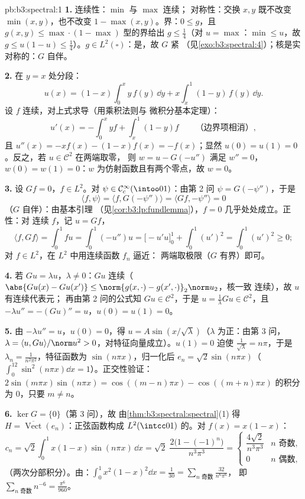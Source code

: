 \begin{solution}{pb:b3:spectral:1}
\textbf{1.} 连续性：$\min$ 与 $\max$ 连续；
对称性：交换 $x, y$ 既不改变 $\min(x,y)$，也不改变 $1 -
\max(x,y)$。界：$0 \leq g$，且 $g(x,y) \leq
\max\cdot(1-\max)$ 型的界给出 $g \leq \frac14$（对 $u
= \max$：$\min \leq u$，故 $g \leq u(1-u) \leq \frac14$）。$g
\in L^2(\square)$：是，故 $G$ 紧
（见\cref{exo:b3:spectral:4}）；核是实对称的：$G$
自伴。

\textbf{2.} 在 $y = x$ 处分段：
\[
u(x) = (1 - x)\int_0^x y\,f(y)\,\dd y +
x\int_x^1(1 - y)\,f(y)\,\dd y .
\]
设 $f$ 连续，对上式求导（用乘积法则与
微积分基本定理）：
\[
u'(x) = -\int_0^xyf + \int_x^1(1-y)f
\qquad\text{（边界项相消）},
\]
且 $u''(x) = -xf(x) - (1 - x)f(x) = -f(x)$；显然 $u(0) =
u(1) = 0$。反之，若 $u \in \mathcal C^2$ 在两端取零，
则 $w = u - G(-u'')$ 满足 $w'' = 0$，$w(0) = w(1) =
0$：$w$ 为仿射函数且有两个零点，故 $w = 0$。

\textbf{3.} 设 $Gf = 0$，$f \in L^2$。对 $\psi \in \mathcal
C_c^\infty(\intoo01)$：由第 2 问 $\psi = G(-\psi'')$，于是
\[
\langle f, \psi\rangle = \langle f, G(-\psi'')\rangle
= \langle Gf, -\psi''\rangle = 0
\]
（$G$ 自伴）：由基本引理
（见\cref{cor:b3:lp:fundlemma}），$f = 0$ 几乎处处成立。正性：对
连续 $f$，记 $u = Gf$，
\[
\langle f, Gf\rangle = \int_0^1 fu = \int_0^1(-u'')u
= \bigl[-u'u\bigr]_0^1 + \int_0^1(u')^2 = \int_0^1(u')^2
\geq 0 ;
\]
对 $f \in L^2$，在 $L^2$ 中用连续函数 $f_n$ 逼近：
两端取极限（$G$ 有界）即可。

\textbf{4.} 若 $Gu = \lambda u$，$\lambda \neq 0$：$Gu$
连续（$\abs{Gu(x) - Gu(x')} \leq \norm{g(x,\cdot) -
g(x',\cdot)}_2\norm u_2$，核一致
连续），故 $u$ 有连续代表元；
再由第 2 问的公式知 $Gu \in \mathcal C^2$，于是 $u =
\frac1\lambda Gu \in \mathcal C^2$，且 $-\lambda u'' =
-(Gu)'' = u$，$u(0) = u(1) = 0$。

\textbf{5.} 由 $-\lambda u'' = u$，$u(0) = 0$，得 $u = A\sin(x/\sqrt
\lambda)$（$\lambda$ 为正：由第 3 问，$\lambda =
\langle u, Gu\rangle/\norm u^2 > 0$，对特征向量成立）。$u(1) =
0$ 迫使 $\frac1{\sqrt\lambda} = n\pi$，于是 $\lambda_n =
\frac1{n^2\pi^2}$，特征函数为 $\sin(n\pi x)$，归一化后
$e_n = \sqrt2\sin(n\pi x)$（$\int_0^12\sin^2(n\pi x)\dd x =
1$）。正交性验证：$2\sin(m\pi x)\sin(n\pi x) =
\cos((m-n)\pi x) - \cos((m+n)\pi x)$ 的积分为 $0$，只要 $m
\neq n$。

\textbf{6.} $\ker G = \{0\}$（第 3 问），故
由\cref{thm:b3:spectral:spectral}(1) 得 $H =
\overline{\operatorname{Vect}}(e_n)$：正弦函数构成
$L^2(\intcc01)$ 的。对 $f(x) = x(1 - x)$：
\[
c_n = \sqrt2\int_0^1x(1-x)\sin(n\pi x)\,\dd x
= \sqrt2\;\frac{2\bigl(1 - (-1)^n\bigr)}{n^3\pi^3}
= \begin{cases}\dfrac{4\sqrt2}{n^3\pi^3} & n \text{ 奇数},\\
0 & n \text{ 偶数},\end{cases}
\]
（两次分部积分）。由：$\int_0^1x^2(1-x)^2\dd
x = \frac1{30} = \sum_{n \text{ 奇数}}\frac{32}{n^6\pi^6}$，
即 $\sum_{n\text{ 奇数}}n^{-6} = \frac{\pi^6}{960}$。


\end{solution}
